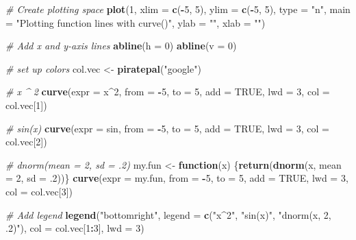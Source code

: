 \documentclass[]{book}
\newenvironment{Shaded}{\begin{snugshade}}{\end{snugshade}}
\newcommand{\KeywordTok}[1]{\textcolor[rgb]{0.13,0.29,0.53}{\textbf{#1}}}
\newcommand{\DataTypeTok}[1]{\textcolor[rgb]{0.13,0.29,0.53}{#1}}
\newcommand{\DecValTok}[1]{\textcolor[rgb]{0.00,0.00,0.81}{#1}}
\newcommand{\StringTok}[1]{\textcolor[rgb]{0.31,0.60,0.02}{#1}}
\newcommand{\CommentTok}[1]{\textcolor[rgb]{0.56,0.35,0.01}{\textit{#1}}}
\newcommand{\OtherTok}[1]{\textcolor[rgb]{0.56,0.35,0.01}{#1}}
\newcommand{\ControlFlowTok}[1]{\textcolor[rgb]{0.13,0.29,0.53}{\textbf{#1}}}
\newcommand{\OperatorTok}[1]{\textcolor[rgb]{0.81,0.36,0.00}{\textbf{#1}}}
\newcommand{\NormalTok}[1]{#1}
\theoremstyle{definition}
\theoremstyle{definition}
\theoremstyle{remark}
\begin{document}
\begin{Shaded}
\begin{Highlighting}[]
\CommentTok{# Create plotting space}
\KeywordTok{plot}\NormalTok{(}\DecValTok{1}\NormalTok{, }
     \DataTypeTok{xlim =} \KeywordTok{c}\NormalTok{(}\OperatorTok{-}\DecValTok{5}\NormalTok{, }\DecValTok{5}\NormalTok{), }\DataTypeTok{ylim =} \KeywordTok{c}\NormalTok{(}\OperatorTok{-}\DecValTok{5}\NormalTok{, }\DecValTok{5}\NormalTok{),}
     \DataTypeTok{type =} \StringTok{"n"}\NormalTok{, }
     \DataTypeTok{main =} \StringTok{"Plotting function lines with curve()"}\NormalTok{,}
     \DataTypeTok{ylab =} \StringTok{""}\NormalTok{, }\DataTypeTok{xlab =} \StringTok{""}\NormalTok{)}

\CommentTok{# Add x and y-axis lines}
\KeywordTok{abline}\NormalTok{(}\DataTypeTok{h =} \DecValTok{0}\NormalTok{)}
\KeywordTok{abline}\NormalTok{(}\DataTypeTok{v =} \DecValTok{0}\NormalTok{)}

\CommentTok{# set up colors}
\NormalTok{col.vec <-}\StringTok{ }\KeywordTok{piratepal}\NormalTok{(}\StringTok{"google"}\NormalTok{)}

\CommentTok{# x ^ 2}
\KeywordTok{curve}\NormalTok{(}\DataTypeTok{expr =}\NormalTok{ x}\OperatorTok{^}\DecValTok{2}\NormalTok{, }\DataTypeTok{from =} \OperatorTok{-}\DecValTok{5}\NormalTok{, }\DataTypeTok{to =} \DecValTok{5}\NormalTok{,}
      \DataTypeTok{add =} \OtherTok{TRUE}\NormalTok{, }\DataTypeTok{lwd =} \DecValTok{3}\NormalTok{, }\DataTypeTok{col =}\NormalTok{ col.vec[}\DecValTok{1}\NormalTok{])}

\CommentTok{# sin(x)}
\KeywordTok{curve}\NormalTok{(}\DataTypeTok{expr =}\NormalTok{ sin, }\DataTypeTok{from =} \OperatorTok{-}\DecValTok{5}\NormalTok{, }\DataTypeTok{to =} \DecValTok{5}\NormalTok{,}
      \DataTypeTok{add =} \OtherTok{TRUE}\NormalTok{, }\DataTypeTok{lwd =} \DecValTok{3}\NormalTok{, }\DataTypeTok{col =}\NormalTok{ col.vec[}\DecValTok{2}\NormalTok{])}

\CommentTok{# dnorm(mean = 2, sd = .2)}
\NormalTok{my.fun <-}\StringTok{ }\ControlFlowTok{function}\NormalTok{(x) \{}\KeywordTok{return}\NormalTok{(}\KeywordTok{dnorm}\NormalTok{(x, }\DataTypeTok{mean =} \DecValTok{2}\NormalTok{, }\DataTypeTok{sd =}\NormalTok{ .}\DecValTok{2}\NormalTok{))\}}
\KeywordTok{curve}\NormalTok{(}\DataTypeTok{expr =}\NormalTok{ my.fun, }
      \DataTypeTok{from =} \OperatorTok{-}\DecValTok{5}\NormalTok{, }\DataTypeTok{to =} \DecValTok{5}\NormalTok{,}
      \DataTypeTok{add =} \OtherTok{TRUE}\NormalTok{, }
      \DataTypeTok{lwd =} \DecValTok{3}\NormalTok{, }\DataTypeTok{col =}\NormalTok{ col.vec[}\DecValTok{3}\NormalTok{])}

\CommentTok{# Add legend}
\KeywordTok{legend}\NormalTok{(}\StringTok{"bottomright"}\NormalTok{,}
       \DataTypeTok{legend =} \KeywordTok{c}\NormalTok{(}\StringTok{"x^2"}\NormalTok{, }\StringTok{"sin(x)"}\NormalTok{, }\StringTok{"dnorm(x, 2, .2)"}\NormalTok{),}
       \DataTypeTok{col =}\NormalTok{ col.vec[}\DecValTok{1}\OperatorTok{:}\DecValTok{3}\NormalTok{], }
       \DataTypeTok{lwd =} \DecValTok{3}\NormalTok{)}
\end{Highlighting}
\end{Shaded}
\end{document}
